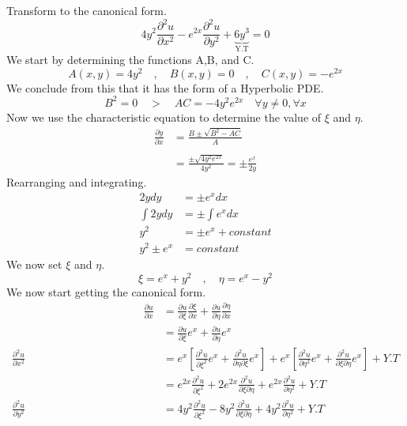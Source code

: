 \begin{example}
    Transform to the canonical form.
    \[
        4y^2\frac{\partial^2 u}{\partial x^2}-e^{2x}\frac{\partial^2 u}{\partial y^2}+\underbrace{6y^3}_{\text{Y.T}} = 0    
    \]
    We start by determining the functions A,B, and C.
    \[
        A\left(x,y\right)=4y^2 \quad,\quad B\left(x,y\right)=0 \quad,\quad C\left(x,y\right)=-e^{2x}    
    \]
    We conclude from this that it has the form of a Hyperbolic PDE.
    \[
        B^2 =0 \quad>\quad AC=-4y^2e^{2x} \quad \forall y\neq0 , \forall x    
    \]
    Now we use the characteristic equation to determine the value of $\xi$ and $\eta$.
    \begin{align*}
        \frac{\partial y}{\partial x} &= \frac{B\pm\sqrt{B^2 -AC}}{A}\\
        \\
        &= \frac{\pm\sqrt{4y^2 e^{2x}}}{4y^2}=\pm\frac{e^x}{2y}
    \end{align*}
    Rearranging and integrating.
    \begin{align*}
        2ydy &= \pm e^x dx
        \\
        \int 2ydy &= \pm \int e^x dx
        \\
        y^2 &= \pm e^x + constant
        \\
        y^2 \pm e^x &= constant 
    \end{align*}
    We now set $\xi$ and $\eta$.
    \[
        \xi = e^x + y^2 \quad , \quad \eta = e^x - y^2    
    \]
    We now start getting the canonical form.
    \begin{align*}
        \hspace{5cm}
        \frac{\partial u}{\partial x} &= \frac{\partial u}{\partial\xi}\frac{\partial\xi}{\partial x} + \frac{\partial u }{\partial\eta}\frac{\partial\eta}{\partial x}
        \\
        &= \frac{\partial u}{\partial\xi}e^x+\frac{\partial u}{\partial\eta}e^x
        \\
        \frac{\partial^2 u}{\partial x^2} &= e^x\left[\frac{\partial^2 u}{\partial\xi^2} e^x + \frac{\partial^2 u}{\partial\eta\partial\xi}e^x\right]+e^x\left[\frac{\partial^2 u}{\partial\eta^2} e^x + \frac{\partial^2 u}{\partial\xi\partial\eta}e^x\right]+Y.T
        \\
        &= e^{2x}\frac{\partial^2 u}{\partial\xi^2}+2e^{2x}\frac{\partial^2 u}{\partial\xi\partial\eta}+e^{2x}\frac{\partial^2 u}{\partial\eta^2}+Y.T
        \\
        \frac{\partial^2 u}{\partial y^2} &= 4y^2\frac{\partial^2 u}{\partial\xi^2}-8y^2\frac{\partial^2 u}{\partial\xi\partial\eta}+4y^2\frac{\partial^2 u}{\partial\eta^2}+Y.T

\end{align*}
\end{example}
